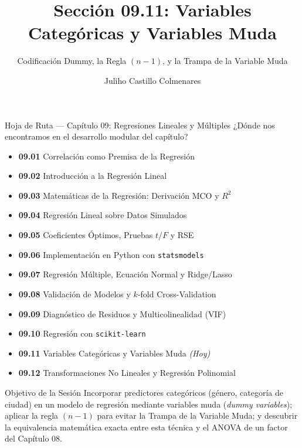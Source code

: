 \documentclass[10pt, aspectratio=169]{beamer}
\title[Variables Categóricas]{Sección 09.11: Variables Categóricas y Variables Muda}
\subtitle{Codificación Dummy, la Regla $(n-1)$, y la Trampa de la Variable Muda}
\author[J. Castillo Colmenares]{Juliho Castillo Colmenares}
\institute{Tecnológico de Monterrey}
\date{\vspace{-1.2cm}}
\begin{document}
\begin{frame}[plain]
  \vspace{-0.8cm}
  \titlepage
\end{frame}

\begin{frame}{Hoja de Ruta --- Capítulo 09: Regresiones Lineales y Múltiples}
  \scriptsize
  ¿Dónde nos encontramos en el desarrollo modular del capítulo?
  \begin{itemize}\itemsep=0.02em
    \item \textbf{09.01} Correlación como Premisa de la Regresión
    \item \textbf{09.02} Introducción a la Regresión Lineal
    \item \textbf{09.03} Matemáticas de la Regresión: Derivación MCO y $R^2$
    \item \textbf{09.04} Regresión Lineal sobre Datos Simulados
    \item \textbf{09.05} Coeficientes Óptimos, Pruebas $t$/$F$ y RSE
    \item \textbf{09.06} Implementación en Python con \texttt{statsmodels}
    \item \textbf{09.07} Regresión Múltiple, Ecuación Normal y Ridge/Lasso
    \item \textbf{09.08} Validación de Modelos y $k$-fold Cross-Validation
    \item \textbf{09.09} Diagnóstico de Residuos y Multicolinealidad (VIF)
    \item \textbf{09.10} Regresión con \texttt{scikit-learn}
    \item \textbf{09.11} Variables Categóricas y Variables Muda \emph{(Hoy)}
    \item \textbf{09.12} Transformaciones No Lineales y Regresión Polinomial
  \end{itemize}
  \pause
  \vspace{-0.05cm}
  \begin{block}{Objetivo de la Sesión}
    Incorporar predictores categóricos (género, categoría de ciudad) en un modelo de regresión mediante variables muda (\emph{dummy variables}); aplicar la regla $(n-1)$ para evitar la Trampa de la Variable Muda; y descubrir la equivalencia matemática exacta entre esta técnica y el ANOVA de un factor del Capítulo 08.
  \end{block}
\end{frame}
\end{document}
